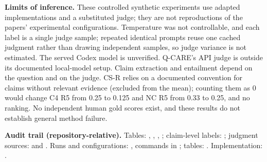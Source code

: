 \documentclass[11pt,a4paper]{article}
\begin{document}
\textbf{Limits of inference.} These controlled synthetic experiments use adapted implementations
and a substituted judge; they are not reproductions of the papers' experimental configurations.
Temperature was not controllable, and each label is a single judge sample; repeated identical
prompts reuse one cached judgment rather than drawing independent samples, so judge variance is
not estimated. The served Codex model is unverified. Q-CARE's API judge is outside its documented
local-model setup. Claim extraction and entailment depend on the question and on the judge.
CS-R relies on a documented convention for claims without relevant evidence (excluded from the mean);
counting them as 0 would change C4 R5 from 0.25 to 0.125 and NC R5 from 0.33 to 0.25, and no ranking. No independent human
gold scores exist, and these results do not establish general method failure.

\vspace{2pt}
{\fontsize{8.5}{10.3}\selectfont\raggedright
\textbf{Audit trail (repository-relative).}
Tables: , ,
, ;
claim-level labels: ;
judgment sources:  and .
Runs and configurations: , commands in ;
tables: . Implementation: .\par
}
\end{document}
